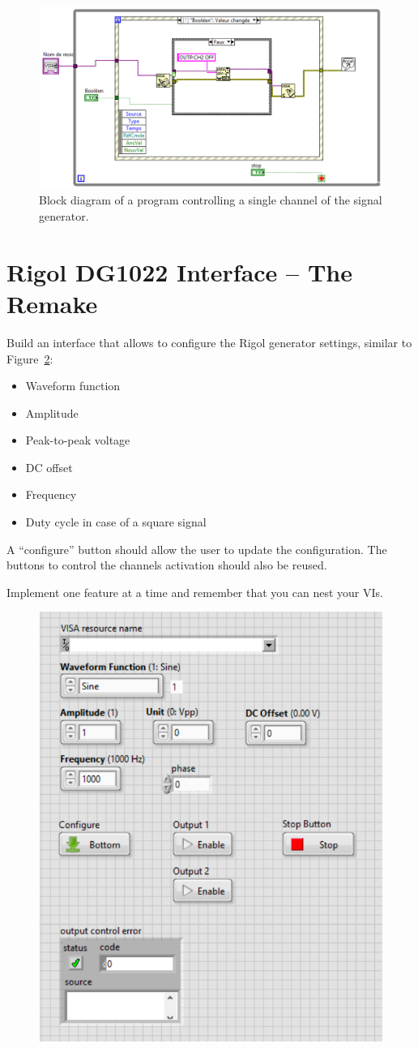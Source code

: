 \documentclass{labo}
\begin{document}
\begin{figure}[ht!]
\centering
\includegraphics[width=\linewidth]{block-diagram-channel.png}
\caption{Block diagram of a program controlling a single channel of the signal generator.}
\label{fig:block-diagram-channel}
\end{figure}


\section{Rigol DG1022 Interface -- The Remake}
Build an interface that allows to configure the Rigol generator settings, similar to Figure~\ref{fig:front-panel-Rigol}:
\begin{itemize}
  \item Waveform function
  \item Amplitude
  \item Peak-to-peak voltage
  \item DC offset
  \item Frequency
  \item Duty cycle in case of a square signal
\end{itemize}
A ``configure'' button should allow the user to update the configuration.
The buttons to control the channels activation should also be reused.

Implement one feature at a time and remember that you can nest your VIs.

\begin{figure}[ht!]
\centering
\includegraphics[width=.5\linewidth]{front-panel-Rigol.png}
\caption{}
\label{fig:front-panel-Rigol}
\end{figure}
\end{document}
